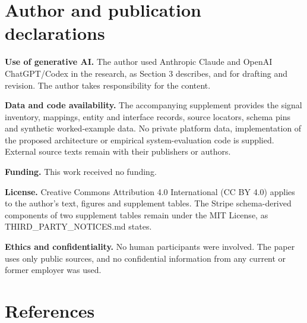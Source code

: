 \documentclass[acmlarge,review,anonymous,nonacm]{acmart}
\begin{document}
\hypertarget{author-and-publication-declarations}{%
\section*{Author and publication
declarations}\label{author-and-publication-declarations}}

\textbf{Use of generative AI.} The author used Anthropic Claude and
OpenAI ChatGPT/Codex in the research, as Section 3 describes, and for
drafting and revision. The author takes responsibility for the content.

\textbf{Data and code availability.} The accompanying supplement
provides the signal inventory, mappings, entity and interface records,
source locators, schema pins and synthetic worked-example data. No
private platform data, implementation of the proposed architecture or
empirical system-evaluation code is supplied. External source texts
remain with their publishers or authors.

\textbf{Funding.} This work received no funding.

\textbf{License.} Creative Commons Attribution 4.0 International (CC BY
4.0) applies to the author's text, figures and supplement tables. The
Stripe schema-derived components of two supplement tables remain under
the MIT License, as THIRD\_PARTY\_NOTICES.md states.

\textbf{Ethics and confidentiality.} No human participants were
involved. The paper uses only public sources, and no confidential
information from any current or former employer was used.

\hypertarget{references}{%
\section*{References}\label{references}}
\end{document}
